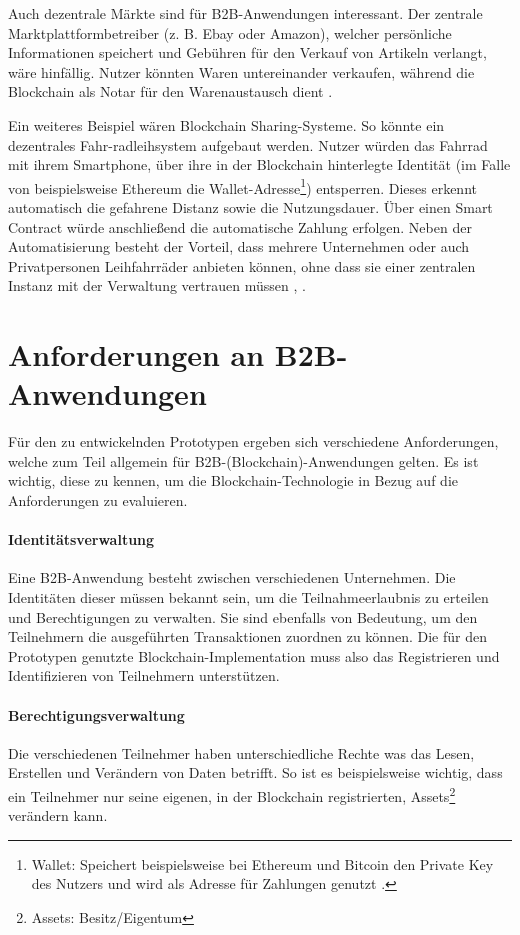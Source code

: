 Auch dezentrale Märkte sind für \acs{B2B}-Anwendungen interessant. Der zentrale Marktplattformbetreiber (z. B. Ebay oder Amazon), welcher persönliche Informationen speichert und Gebühren für den Verkauf von Artikeln verlangt, wäre hinfällig. Nutzer könnten Waren untereinander verkaufen, während die Blockchain als Notar für den Warenaustausch dient \cite{BenHamidaBlockchainEnterpriseOverview2017}.

Ein weiteres Beispiel wären Blockchain Sharing-Systeme. So könnte ein dezentrales Fahr-radleihsystem aufgebaut werden. Nutzer würden das Fahrrad mit ihrem Smartphone, über ihre in der Blockchain hinterlegte Identität (im Falle von beispielsweise Ethereum die Wallet-Adresse\footnote{Wallet: Speichert beispielsweise bei Ethereum und Bitcoin den Private Key des Nutzers und wird als Adresse für Zahlungen genutzt \cite[S.~61 ff.]{AntonopoulosMasteringbitcoin2015}.}) entsperren. Dieses erkennt automatisch die gefahrene Distanz sowie die Nutzungsdauer. Über einen Smart Contract würde anschließend die automatische Zahlung erfolgen. Neben der Automatisierung besteht der Vorteil, dass mehrere Unternehmen oder auch Privatpersonen Leihfahrräder anbieten können, ohne dass sie einer zentralen Instanz mit der Verwaltung vertrauen müssen \cite{FutureFluxFestivalBlockchainBikes}, \cite{FischerIoTBlockchain}.

\section{Anforderungen an B2B-Anwendungen}
\label{sec:general-requirements}
Für den zu entwickelnden Prototypen ergeben sich verschiedene Anforderungen, welche zum Teil allgemein für \acs{B2B}-(Blockchain)-Anwendungen gelten. Es ist wichtig, diese zu kennen, um die Blockchain-Technologie in Bezug auf die Anforderungen zu evaluieren.

\paragraph{Identitätsverwaltung}
Eine \acs{B2B}-Anwendung besteht zwischen verschiedenen Unternehmen. Die Identitäten dieser müssen bekannt sein, um die Teilnahmeerlaubnis zu erteilen und Berechtigungen zu verwalten. Sie sind ebenfalls von Bedeutung, um den Teilnehmern die ausgeführten Transaktionen zuordnen zu können. Die für den Prototypen genutzte Blockchain-Implementation muss also das Registrieren und Identifizieren von Teilnehmern unterstützen.

\paragraph{Berechtigungsverwaltung}
Die verschiedenen Teilnehmer haben unterschiedliche Rechte was das Lesen, Erstellen und Verändern von Daten betrifft. So ist es beispielsweise wichtig, dass ein Teilnehmer nur seine eigenen, in der Blockchain registrierten, Assets\footnote{Assets: Besitz/Eigentum} verändern kann.

